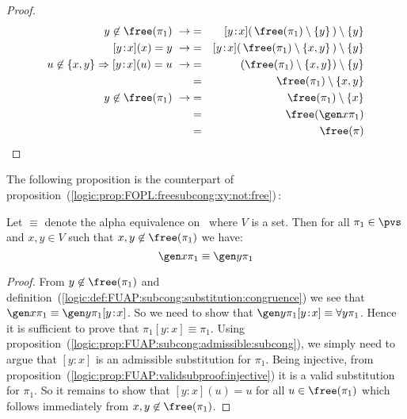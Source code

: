 \begin{proof}
\begin{eqnarray*}
    y\not\in\free(\pi_{1})\ \rightarrow
    &=&[y\!:\!x](\,\free(\pi_{1})\setminus\{y\}\,)\setminus\{y\}\\
    \mbox{$[y\!:\!x](x)=y$}\ \rightarrow
    &=&[y\!:\!x](\,\free(\pi_{1})\setminus\{x,y\}\,)\setminus\{y\}\\
    \mbox{$u\not\in\{x,y\}\Rightarrow[y\!:\!x](u)=u$}\ \rightarrow
    &=&(\free(\pi_{1})\setminus\{x,y\})\setminus\{y\}\\
    &=&\free(\pi_{1})\setminus\{x,y\}\\
    y\not\in\free(\pi_{1})\ \rightarrow
    &=&\free(\pi_{1})\setminus\{x\}\\
    &=&\free(\gen x\pi_{1})\\
    &=&\free(\pi)\\
    \end{eqnarray*}
\end{proof}

The following proposition is the counterpart of
proposition~(\ref{logic:prop:FOPL:freesubcong:xy:not:free})\,:
\begin{prop}\label{logic:prop:FUAP:charsubcong:xy:not:free}
Let $\equiv$ denote the alpha equivalence on \pvs\ where $V$
is a set. Then for all $\pi_{1}\in\pvs$ and $x,y\in V$ such that
$x,y\not\in\free(\pi_{1})$ we have:
    \[
    \gen x\pi_{1}\equiv\gen y\pi_{1}
    \]
\end{prop}
\begin{proof}
From $y\not\in\free(\pi_{1})$ and
definition~(\ref{logic:def:FUAP:subcong:substitution:congruence}) we
see that $\gen x\pi_{1}\equiv\gen y\pi_{1}[y\!:\!x]$. So we need to
show that $\gen y\pi_{1}[y\!:\!x]\equiv\forall y\pi_{1}$. Hence it
is sufficient to prove that $\pi_{1}[y\!:\!x]\equiv\pi_{1}$. Using
proposition~(\ref{logic:prop:FUAP:subcong:admissible:subcong}), we
simply need to argue that $[y\!:\!x]$ is an admissible substitution
for $\pi_{1}$. Being injective, from
proposition~(\ref{logic:prop:FUAP:validsubproof:injective}) it is a
valid substitution for $\pi_{1}$. So it remains to show that
$[y\!:\!x](u)=u$ for all $u\in\free(\pi_{1})$ which follows
immediately from $x,y\not\in\free(\pi_{1})$.
\end{proof}


